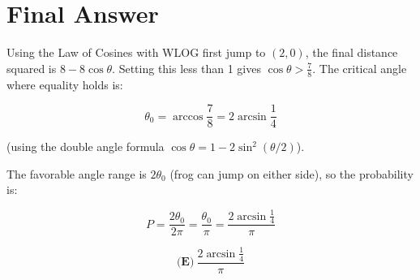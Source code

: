 \documentclass[12pt]{article}
\begin{document}
\section*{Final Answer}

Using the Law of Cosines with WLOG first jump to $(2,0)$, the final distance squared is $8 - 8\cos\theta$. Setting this less than 1 gives $\cos\theta > \frac{7}{8}$. The critical angle where equality holds is:

$$\theta_0 = \arccos\frac{7}{8} = 2\arcsin\frac{1}{4}$$

(using the double angle formula $\cos\theta = 1 - 2\sin^2(\theta/2)$).

The favorable angle range is $2\theta_0$ (frog can jump on either side), so the probability is:

$$P = \frac{2\theta_0}{2\pi} = \frac{\theta_0}{\pi} = \frac{2\arcsin\frac{1}{4}}{\pi}$$

$$\boxed{\textbf{(E)}~\frac{2\arcsin \frac{1}{4}}{\pi}}$$
\end{document}
